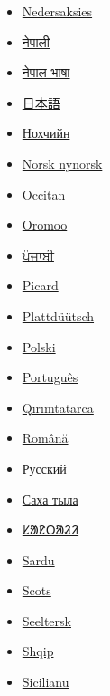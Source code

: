 \documentclass[11pt,a4paper]{article}
\begin{document}
\begin{itemize}
\item \href{https://nds-nl.wikipedia.org/wiki/Ente}{Nedersaksies}
\item \href{https://ne.wikipedia.org/wiki/\%E0\%A4\%B9\%E0\%A4\%BE\%E0\%A4\%81\%E0\%A4\%B8}{नेपाली}
\item \href{https://new.wikipedia.org/wiki/\%E0\%A4\%B9\%E0\%A4\%81\%E0\%A4\%AF\%E0\%A5\%8D}{नेपाल भाषा}
\item \href{https://ja.wikipedia.org/wiki/\%E3\%82\%AB\%E3\%83\%A2}{日本語}
\item \href{https://ce.wikipedia.org/wiki/\%D0\%91\%D0\%B5\%D0\%B4\%D0\%B0\%D1\%88}{Нохчийн}
\item \href{https://nn.wikipedia.org/wiki/And}{Norsk nynorsk}
\item \href{https://oc.wikipedia.org/wiki/Guit}{Occitan}
\item \href{https://om.wikipedia.org/wiki/Daakiyyee}{Oromoo}
\item \href{https://pa.wikipedia.org/wiki/\%E0\%A8\%AC\%E0\%A8\%A4\%E0\%A8\%96\%E0\%A8\%BC}{ਪੰਜਾਬੀ}
\item \href{https://pcd.wikipedia.org/wiki/Can\%C3\%A8rd}{Picard}
\item \href{https://nds.wikipedia.org/wiki/Aanten}{Plattdüütsch}
\item \href{https://pl.wikipedia.org/wiki/Kaczka}{Polski}
\item \href{https://pt.wikipedia.org/wiki/Pato}{Português}
\item \href{https://crh.wikipedia.org/wiki/Papiy}{Qırımtatarca}
\item \href{https://ro.wikipedia.org/wiki/Ra\%C8\%9B\%C4\%83}{Română}
\item \href{https://ru.wikipedia.org/wiki/\%D0\%A3\%D1\%82\%D0\%BA\%D0\%B8}{Русский}
\item \href{https://sah.wikipedia.org/wiki/\%D0\%9A\%D1\%83\%D1\%81\%D1\%82\%D0\%B0\%D1\%80}{Саха тыла}
\item \href{https://sat.wikipedia.org/wiki/\%E1\%B1\%9C\%E1\%B1\%AE\%E1\%B1\%B0\%E1\%B1\%AE}{ᱥᱟᱱᱛᱟᱲᱤ}
\item \href{https://sc.wikipedia.org/wiki/Anade}{Sardu}
\item \href{https://sco.wikipedia.org/wiki/Deuk}{Scots}
\item \href{https://stq.wikipedia.org/wiki/Oante}{Seeltersk}
\item \href{https://sq.wikipedia.org/wiki/Rosa}{Shqip}
\item \href{https://scn.wikipedia.org/wiki/P\%C3\%A0para\_(\%C3\%A0natra)}{Sicilianu}

\end{itemize}
\end{document}
